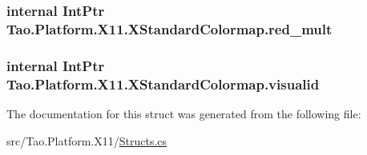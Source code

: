 \label{struct_tao_1_1_platform_1_1_x11_1_1_x_standard_colormap_ae1f7beda08f461493902b17293468932}
\hypertarget{struct_tao_1_1_platform_1_1_x11_1_1_x_standard_colormap_aa186fa91a4c03cd28bc4c895f38f41e8}{
\subsubsection[{red\_\-mult}]{\setlength{\rightskip}{0pt plus 5cm}internal IntPtr {\bf Tao.Platform.X11.XStandardColormap.red\_\-mult}}}
\label{struct_tao_1_1_platform_1_1_x11_1_1_x_standard_colormap_aa186fa91a4c03cd28bc4c895f38f41e8}
\hypertarget{struct_tao_1_1_platform_1_1_x11_1_1_x_standard_colormap_a0a88c184ee116a8358b344eefe0a093e}{
\subsubsection[{visualid}]{\setlength{\rightskip}{0pt plus 5cm}internal IntPtr {\bf Tao.Platform.X11.XStandardColormap.visualid}}}
\label{struct_tao_1_1_platform_1_1_x11_1_1_x_standard_colormap_a0a88c184ee116a8358b344eefe0a093e}


The documentation for this struct was generated from the following file:\begin{DoxyCompactItemize}
\item 
src/Tao.Platform.X11/\hyperlink{_structs_8cs}{Structs.cs}\end{DoxyCompactItemize}
